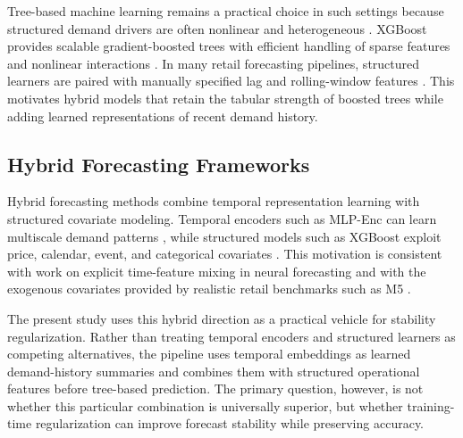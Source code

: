 \documentclass[10pt,conference]{IEEEtran}
\begin{document}
Tree-based machine learning remains a practical choice in such settings because structured demand drivers are often nonlinear and heterogeneous \cite{fildes2022retail,makridakis2022m5}. XGBoost provides scalable gradient-boosted trees with efficient handling of sparse features and nonlinear interactions \cite{chen2016xgboost}. In many retail forecasting pipelines, structured learners are paired with manually specified lag and rolling-window features \cite{fildes2022retail}. This motivates hybrid models that retain the tabular strength of boosted trees while adding learned representations of recent demand history.

\subsection{Hybrid Forecasting Frameworks}
Hybrid forecasting methods combine temporal representation learning with structured covariate modeling. Temporal encoders such as MLP-Enc can learn multiscale demand patterns \cite{wang2024timemixer}, while structured models such as XGBoost exploit price, calendar, event, and categorical covariates \cite{chen2016xgboost}. This motivation is consistent with work on explicit time-feature mixing in neural forecasting and with the exogenous covariates provided by realistic retail benchmarks such as M5 \cite{chen2023tsmixer,makridakis2022m5}.

The present study uses this hybrid direction as a practical vehicle for stability regularization. Rather than treating temporal encoders and structured learners as competing alternatives, the pipeline uses temporal embeddings as learned demand-history summaries and combines them with structured operational features before tree-based prediction. The primary question, however, is not whether this particular combination is universally superior, but whether training-time regularization can improve forecast stability while preserving accuracy.
\end{document}
